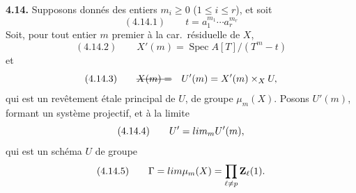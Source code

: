 \documentclass[11pt,a4paper]{article}
\begin{document}
\textbf{4.14.}  \struck{\ill{}} Supposons   donnés des entiers $m_i \geq 0$ ($1 \leq i \leq r$), et  soit
\[
(4.14.1) \qquad t = a_1^{m_1} \cdots a_r^{m_r}
\]
Soit, pour tout entier $m$ premier à la car.\ résiduelle de $X$,
\[
(4.14.2) \qquad X'(m) = \operatorname{Spec} A[T]/(T^m - t)
\]
et 
\[
(4.14.3) \qquad \text{\struck{$X(m) =$}} \quad U'(m) = X'(m) \times_X U ,
\]
qui est un revêtement étale principal de $U$, de groupe $\mu_m(X)$. Posons  $U'(m)$, formant un système projectif, et  à la limite
\[
(4.14.4) \qquad U' = \varprojlim_m U'(m) ,
\]
qui est un schéma   $U$ de groupe
\[
(4.14.5) \qquad \Gamma = \varprojlim \mu_m(X) = \prod_{\ell \neq p} \mathbf{Z}_\ell(1) .
\]
\end{document}
